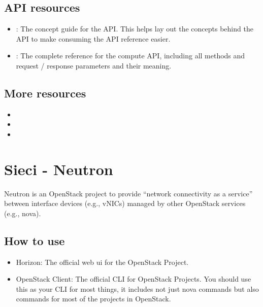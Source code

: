 \documentclass[letterpaper,10pt,english]{sphinxmanual}
\begin{document}
\subsection{API resources}
\label{\detokenize{basics/README:api-resources}}\begin{itemize}
\item {} 
: The concept guide for the API. This helps lay out the concepts behind the API to make consuming the API reference easier.

\item {} 
: The complete reference for the compute API, including all methods and request / response parameters and their meaning.

\end{itemize}


\subsection{More resources}
\label{\detokenize{basics/README:more-resources}}\begin{itemize}
\item {} 

\item {} 

\item {} 

\end{itemize}


\section{Sieci - Neutron}
\label{\detokenize{basics/README:sieci-neutron}}
Neutron is an OpenStack project to provide “network connectivity as a service” between interface devices (e.g., vNICs) managed by other OpenStack services (e.g., nova).


\subsection{How to use}
\label{\detokenize{basics/README:id3}}\begin{itemize}
\item {} 
Horizon: The official web ui for the OpenStack Project.

\item {} 
OpenStack Client: The official CLI for OpenStack Projects. You should use this as your CLI for most things, it includes not just nova commands but also commands for most of the projects in OpenStack.

\end{itemize}
\end{document}
